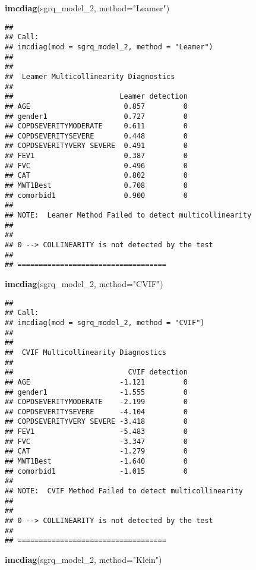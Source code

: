 \documentclass[
]{article}
\newenvironment{Shaded}{\begin{snugshade}}{\end{snugshade}}
\newcommand{\AttributeTok}[1]{\textcolor[rgb]{0.13,0.29,0.53}{#1}}
\newcommand{\FunctionTok}[1]{\textcolor[rgb]{0.13,0.29,0.53}{\textbf{#1}}}
\newcommand{\NormalTok}[1]{#1}
\newcommand{\StringTok}[1]{\textcolor[rgb]{0.31,0.60,0.02}{#1}}
\begin{document}
\begin{Shaded}
\begin{Highlighting}[]
\FunctionTok{imcdiag}\NormalTok{(sgrq\_model\_2, }\AttributeTok{method=}\StringTok{"Leamer"}\NormalTok{)}
\end{Highlighting}
\end{Shaded}

\begin{verbatim}
## 
## Call:
## imcdiag(mod = sgrq_model_2, method = "Leamer")
## 
## 
##  Leamer Multicollinearity Diagnostics
## 
##                         Leamer detection
## AGE                      0.857         0
## gender1                  0.727         0
## COPDSEVERITYMODERATE     0.611         0
## COPDSEVERITYSEVERE       0.448         0
## COPDSEVERITYVERY SEVERE  0.491         0
## FEV1                     0.387         0
## FVC                      0.496         0
## CAT                      0.802         0
## MWT1Best                 0.708         0
## comorbid1                0.900         0
## 
## NOTE:  Leamer Method Failed to detect multicollinearity
## 
## 
## 0 --> COLLINEARITY is not detected by the test
## 
## ===================================
\end{verbatim}

\begin{Shaded}
\begin{Highlighting}[]
\FunctionTok{imcdiag}\NormalTok{(sgrq\_model\_2, }\AttributeTok{method=}\StringTok{"CVIF"}\NormalTok{)}
\end{Highlighting}
\end{Shaded}

\begin{verbatim}
## 
## Call:
## imcdiag(mod = sgrq_model_2, method = "CVIF")
## 
## 
##  CVIF Multicollinearity Diagnostics
## 
##                           CVIF detection
## AGE                     -1.121         0
## gender1                 -1.555         0
## COPDSEVERITYMODERATE    -2.199         0
## COPDSEVERITYSEVERE      -4.104         0
## COPDSEVERITYVERY SEVERE -3.418         0
## FEV1                    -5.483         0
## FVC                     -3.347         0
## CAT                     -1.279         0
## MWT1Best                -1.640         0
## comorbid1               -1.015         0
## 
## NOTE:  CVIF Method Failed to detect multicollinearity
## 
## 
## 0 --> COLLINEARITY is not detected by the test
## 
## ===================================
\end{verbatim}

\begin{Shaded}
\begin{Highlighting}[]
\FunctionTok{imcdiag}\NormalTok{(sgrq\_model\_2, }\AttributeTok{method=}\StringTok{"Klein"}\NormalTok{)}
\end{Highlighting}
\end{Shaded}
\end{document}

